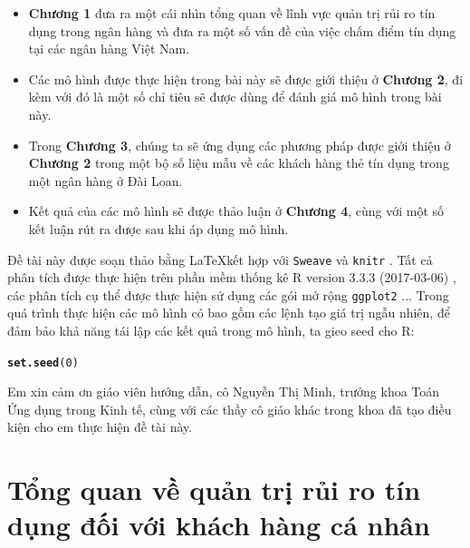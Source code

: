 \documentclass[a4paper]{report}\usepackage[]{graphicx}\usepackage[]{color}
\makeatletter
\newcommand{\hlnum}[1]{\textcolor[rgb]{0.686,0.059,0.569}{#1}}%
\newcommand{\hlstd}[1]{\textcolor[rgb]{0.345,0.345,0.345}{#1}}%
\newcommand{\hlkwd}[1]{\textcolor[rgb]{0.737,0.353,0.396}{\textbf{#1}}}%
\newenvironment{kframe}{%
 \def\at@end@of@kframe{}%
 \ifinner\ifhmode%
  \def\at@end@of@kframe{\end{minipage}}%
  \begin{minipage}{\columnwidth}%
 \fi\fi%
 \def\FrameCommand##1{\hskip\@totalleftmargin \hskip-\fboxsep
 \colorbox{shadecolor}{##1}\hskip-\fboxsep
     \hskip-\linewidth \hskip-\@totalleftmargin \hskip\columnwidth}%
 \MakeFramed {\advance\hsize-\width
   \@totalleftmargin\z@ \linewidth\hsize
   \@setminipage}}%
 {\par\unskip\endMakeFramed%
 \at@end@of@kframe}
\newenvironment{knitrout}{}{} %
\makeatother
\begin{document}
\begin{itemize}
\item \textbf{Chương 1} đưa ra một cái nhìn tổng quan về lĩnh vực quản trị rủi ro tín dụng trong ngân hàng và đưa ra một số vấn đề của việc chấm điểm tín dụng tại các ngân hàng Việt Nam.
\item Các mô hình được thực hiện trong bài này sẽ được giới thiệu ở \textbf{Chương 2}, đi kèm với đó là một số chỉ tiêu sẽ được dùng để đánh giá mô hình trong bài này.
\item Trong \textbf{Chương 3}, chúng ta sẽ ứng dụng các phương pháp được giới thiệu ở \textbf{Chương 2} trong một bộ số liệu mẫu về các khách hàng thẻ tín dụng trong một ngân hàng ở Đài Loan.
\item Kết quả của các mô hình sẽ được thảo luận ở \textbf{Chương 4}, cùng với một số kết luận rút ra được sau khi áp dụng mô hình.
\end{itemize}
Đề tài này được soạn thảo bằng \LaTeX kết hợp với \texttt{Sweave} và \texttt{knitr} 
\citep{r:knitr}. Tất cả phân tích được thực hiện trên phần mềm thống kê 
R version 3.3.3 (2017-03-06) \citep{r:rbase},  
các phân tích cụ thể được thực hiện sử dụng các gói mở rộng \texttt{ggplot2} \citep{r:ggplot2}... Trong quá trình thực hiện các mô hình có bao gồm các lệnh tạo giá trị ngẫu nhiên, để đảm bảo khả năng tái lập các kết quả trong mô hình, ta gieo seed cho R:

\begin{knitrout}
\color{fgcolor}\begin{kframe}
\begin{alltt}
\hlkwd{set.seed}\hlstd{(}\hlnum{0}\hlstd{)}
\end{alltt}
\end{kframe}
\end{knitrout}

Em xin cảm ơn giáo viên hướng dẫn, cô Nguyễn Thị Minh, trưởng khoa 
Toán Ứng dụng trong Kinh tế, cùng với các thầy cô giáo khác trong khoa đã tạo điều kiện cho em thực hiện đề tài này.

\clearpage\tableofcontents
{}

\listoftables
{}

\listoffigures
{}

\chapter{Tổng quan về quản trị rủi ro tín dụng đối với khách hàng cá nhân}
\end{document}
